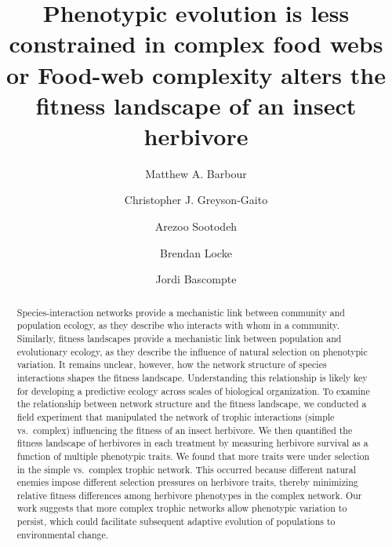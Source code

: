 \documentclass[]{elsarticle} %
\begin{document}
\begin{frontmatter}

  \title{Phenotypic evolution is less constrained in complex food webs or
Food-web complexity alters the fitness landscape of an insect herbivore}
    \author[a,b]{Matthew A. Barbour}
    \author[a,c]{Christopher J. Greyson-Gaito}
  
  
    \author[a]{Arezoo Sootodeh}
  
  
    \author[d]{Brendan Locke}
  
  
    \author[b]{Jordi Bascompte}
  
  
      \address[a]{University of British Columbia, Department of Zoology, 6270 University
Blvd., Vancouver, BC, V6T 1Z4, Canada}
    \address[b]{University of Zurich, Department of Evolutionary Biology and
Environmental Studies, Winterthurerstrasse 190, Zurich, 8057,
Switzerland}
    \address[c]{University of Guelph, Department of Integrative Biology, 50 Stone Rd.
East, Guelph, ONT, N1G 2W1, Canada}
    \address[d]{Humboldt State University, Department of Biological Sciences, 1 Harpst
St., Arcata, CA, 95521, USA}
  
  \begin{abstract}
  Species-interaction networks provide a mechanistic link between
  community and population ecology, as they describe who interacts with
  whom in a community. Similarly, fitness landscapes provide a mechanistic
  link between population and evolutionary ecology, as they describe the
  influence of natural selection on phenotypic variation. It remains
  unclear, however, how the network structure of species interactions
  shapes the fitness landscape. Understanding this relationship is likely
  key for developing a predictive ecology across scales of biological
  organization. To examine the relationship between network structure and
  the fitness landscape, we conducted a field experiment that manipulated
  the network of trophic interactions (simple vs.~complex) influencing the
  fitness of an insect herbivore. We then quantified the fitness landscape
  of herbivores in each treatment by measuring herbivore survival as a
  function of multiple phenotypic traits. We found that more traits were
  under selection in the simple vs.~complex trophic network. This occurred
  because different natural enemies impose different selection pressures
  on herbivore traits, thereby minimizing relative fitness differences
  among herbivore phenotypes in the complex network. Our work suggests
  that more complex trophic networks allow phenotypic variation to
  persist, which could facilitate subsequent adaptive evolution of
  populations to environmental change.
  \end{abstract}
  
 \end{frontmatter}
\end{document}
